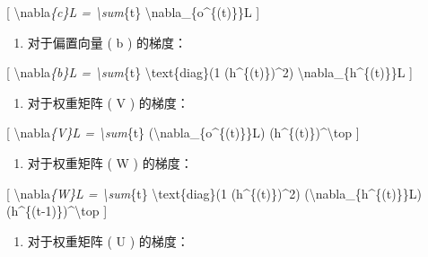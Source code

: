 {[} \textbackslash nabla\emph{\{c\}L = \textbackslash sum}\{t\}
\textbackslash nabla\_\{o\^{}\{(t)\}\}L {]}


\begin{enumerate}
\def\labelenumi{\arabic{enumi}.}
\item
  对于偏置向量 ( b ) 的梯度：
\end{enumerate}

{[} \textbackslash nabla\emph{\{b\}L = \textbackslash sum}\{t\}
\textbackslash text\{diag\}(1 (h\^{}\{(t)\})\^{}2)
\textbackslash nabla\_\{h\^{}\{(t)\}\}L {]}


\begin{enumerate}
\def\labelenumi{\arabic{enumi}.}
\item
  对于权重矩阵 ( V ) 的梯度：
\end{enumerate}

{[} \textbackslash nabla\emph{\{V\}L = \textbackslash sum}\{t\}
(\textbackslash nabla\_\{o\^{}\{(t)\}\}L)
(h\^{}\{(t)\})\^{}\textbackslash top {]}


\begin{enumerate}
\def\labelenumi{\arabic{enumi}.}
\item
  对于权重矩阵 ( W ) 的梯度：
\end{enumerate}

{[} \textbackslash nabla\emph{\{W\}L = \textbackslash sum}\{t\}
\textbackslash text\{diag\}(1 (h\^{}\{(t)\})\^{}2)
(\textbackslash nabla\_\{h\^{}\{(t)\}\}L)
(h\^{}\{(t-1)\})\^{}\textbackslash top {]}


\begin{enumerate}
\def\labelenumi{\arabic{enumi}.}
\item
  对于权重矩阵 ( U ) 的梯度：
\end{enumerate}

